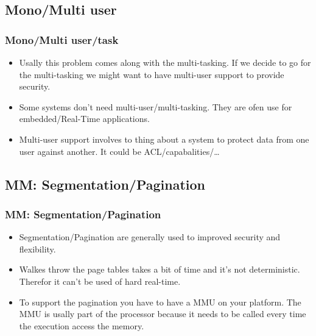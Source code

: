 \subsection{Mono/Multi user}
\begin{frame}
  \frametitle{Mono/Multi user/task}
  \begin{itemize}
        \item Usally this problem comes along with the multi-tasking.
        If we decide to go for the multi-tasking we might want to have 
        multi-user support to provide security.
        \item Some systems don't need multi-user/multi-tasking. They are
        ofen use for embedded/Real-Time applications.
        \item Multi-user support involves to thing about a system to
        protect data from one user against another. It could be
        ACL/capabalities/\ldots
  \end{itemize}
\end{frame}


\subsection{MM: Segmentation/Pagination}
\begin{frame}
  \frametitle{MM: Segmentation/Pagination}
  \begin{itemize}
        \item Segmentation/Pagination are generally used to improved
        security and flexibility.
        \item Walkes throw the page tables takes a bit of time and
        it's not deterministic. Therefor it can't be used of hard
        real-time.
        \item To support the pagination you have to have a MMU on your
        platform. The MMU is usally part of the processor because it
        needs to be called every time the execution access the memory.
  \end{itemize}
\end{frame}

